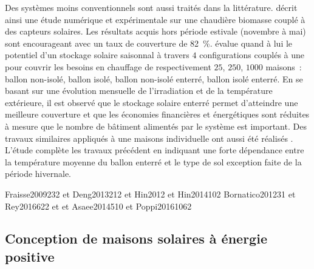 
Des systèmes moins conventionnels sont aussi traités dans la littérature.
\textcite{Hartl2012623} décrit ainsi une étude numérique et expérimentale sur une
chaudière biomasse couplé à des capteurs solaires. Les résultats acquis hors période estivale
(novembre à mai) sont encourageant avec un taux de couverture de \SI{82}{\percent}.
\textcite{Ucar20082532} évalue quand à lui le potentiel d’un stockage solaire saisonnal à travers $4$
configurations couplés à une  pour couvrir les besoins en
chauffage de respectivement $25$, $250$, $1000$ maisons~: ballon non-isolé, ballon isolé, ballon
non-isolé enterré, ballon isolé enterré. En se basant sur une évolution mensuelle de
l’irradiation et de la température extérieure, il est observé que le stockage solaire
enterré permet d’atteindre une meilleure couverture et que les économies financières et
énergétiques sont réduites à mesure que le nombre de bâtiment alimentés par le système est
important. Des travaux similaires appliqués à une maisons individuelle ont aussi
été réalisés \parencite{Yumrutas2012983}. L’étude complète les travaux précédent en
indiquant une forte dépendance entre la température moyenne du ballon enterré et
le type de sol exception faite de la période hivernale.


Fraisse2009232 et Deng2013212 et Hin2012 et Hin2014102
Bornatico201231 et Rey2016622 et et Asaee2014510 et Poppi20161062






\subsection{Conception de maisons solaires à énergie positive} %
\label{sub:conception_de_maisons_solaires_a_energie_positive}
